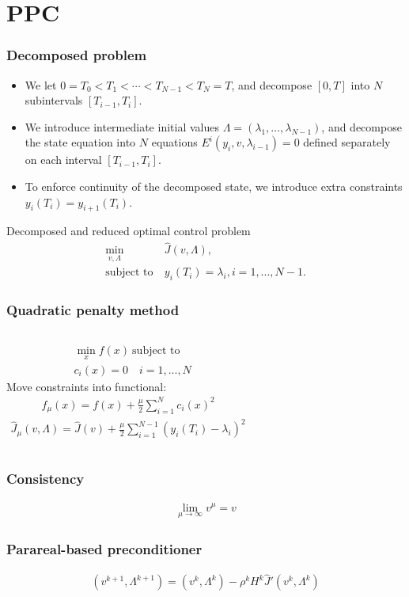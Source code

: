 \documentclass[9pt]{beamer}
\begin{document}
\section{PPC}
\begin{frame}
\frametitle{Decomposed problem}
\begin{itemize}
\item{We let $0=T_0<T_1<\cdots<T_{N-1}<T_N=T$, and decompose $[0,T]$ into $N$ subintervals $[T_{i-1},T_i]$. }
\item{We introduce intermediate initial values $\Lambda=(\lambda_1,...,\lambda_{N-1})$, and decompose the state equation into $N$ equations $E^i(y_i,v,\lambda_{i-1})=0$ defined separately on each interval $[T_{i-1},T_i]$.}
\item{To enforce continuity of the decomposed state, we introduce extra constraints $y_i(T_i)=y_{i+1}(T_i)$.}
\end{itemize}
\begin{block}{Decomposed and reduced optimal control problem}
\begin{align*}
\min_{v,\Lambda} &\hat J(v,\Lambda), \\
\textrm{subject to} \ &y_i(T_i)=\lambda_i,i=1,...,N-1. 
\end{align*}
\end{block}
\end{frame}
\begin{frame}
\frametitle{Quadratic penalty method}
\begin{columns}
\centering
\begin{align*}
&\min_x f(x) \ \textrm{subject to} \\ &c_i(x)=0 \quad i=1,...,N
\end{align*}
Move constraints into functional:
\begin{align*}
f_{\mu}(x) = f(x) + \frac{\mu }{2}\sum_{i=1}^N c_i(x)^2 
\end{align*}
\begin{align*}
\hat{J}_{\mu}(v,\Lambda) = \hat{J}(v) + \frac{\mu}{2}\sum_{i=1}^{N-1}(y_{i}(T_i)-\lambda_i)^2
\end{align*}
\end{columns}
\end{frame}
\begin{frame}
\frametitle{Consistency}
\begin{align*}
\lim_{\mu\rightarrow\infty} v^{\mu}=v
\end{align*}
\end{frame}
\begin{frame}
\frametitle{Parareal-based preconditioner}
\begin{align*}
(v^{k+1},\Lambda^{k+1}) = (v^k,\Lambda^k) - \rho^kH^k \hat J'(v^k,\Lambda^k)
\end{align*}
\end{frame}
\end{document}
